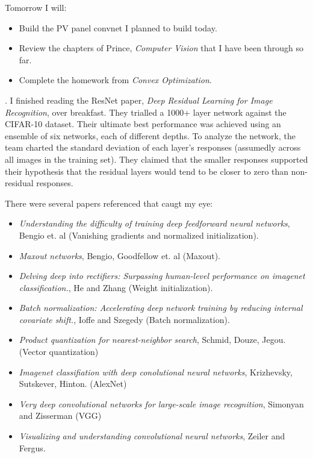 \documentclass[idxtotoc,hyperref,openany]{labbook} %
\begin{document}
Tomorrow I will:
\begin{itemize}
	\item Build the PV panel convnet I planned to build today.
	\item Review the chapters of Prince, \emph{Computer Vision} that I have been through so far.
	\item Complete the homework from \emph{Convex Optimization}.
\end{itemize}



.
I finished reading the ResNet paper, \emph{Deep Residual Learning for Image Recognition}, over  breakfast. They trialled a 1000+ layer network against the CIFAR-10 dataset. Their ultimate best performance was achieved using an ensemble of six networks, each of different depths. To analyze the network, the team charted the standard deviation of each layer's responses (assumedly across all images in the training set). They claimed that the smaller responses supported their hypothesis that the residual layers would tend to be closer to zero than non-residual responses.

There were several papers referenced that caugt my eye:
\begin{itemize}
	\item\emph{Understanding the difficulty of training deep feedforward neural networks}, Bengio et. al (Vanishing gradients and normalized initialization).
	\item \emph{Maxout networks}, Bengio, Goodfellow et. al (Maxout).
	\item \emph{Delving deep into rectifiers: Surpassing human-level performance on imagenet classification.}, He and Zhang (Weight initialization).
	\item \emph{Batch normalization: Accelerating deep network training by reducing internal covariate shift.}, Ioffe and Szegedy (Batch normalization).
	\item \emph{Product quantization for nearest-neighbor search}, Schmid, Douze, Jegou. (Vector quantization)
	\item \emph{Imagenet classifiation with deep conolutional neural networks}, Krizhevsky, Sutskever, Hinton. (AlexNet)
	\item \emph{Very deep convolutional networks for large-scale image recognition}, Simonyan and Zisserman (VGG)
	\item \emph{Visualizing and understanding convolutional neural networks}, Zeiler and Fergus.
\end{itemize}
\end{document}
